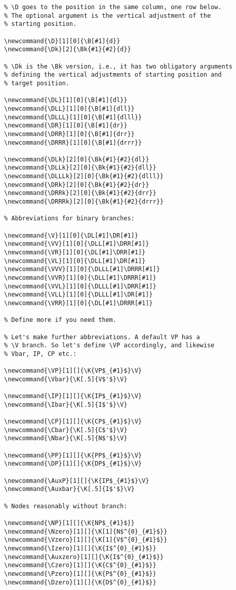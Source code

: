 \documentclass[12pt,a4paper]{article}
\begin{document}
\begin{verbatim}
% \D goes to the position in the same column, one row below. 
% The optional argument is the vertical adjustment of the 
% starting position. 

\newcommand{\D}[1][0]{\B[#1]{d}} 
\newcommand{\Dk}[2]{\Bk{#1}{#2}{d}}

% \Dk is the \Bk version, i.e., it has two obligatory arguments 
% defining the vertical adjustments of starting position and 
% target position.

\newcommand{\DL}[1][0]{\B[#1]{dl}} 
\newcommand{\DLL}[1][0]{\B[#1]{dll}} 
\newcommand{\DLLL}[1][0]{\B[#1]{dlll}} 
\newcommand{\DR}[1][0]{\B[#1]{dr}} 
\newcommand{\DRR}[1][0]{\B[#1]{drr}} 
\newcommand{\DRRR}[1][0]{\B[#1]{drrr}} 

\newcommand{\DLk}[2][0]{\Bk{#1}{#2}{dl}} 
\newcommand{\DLLk}[2][0]{\Bk{#1}{#2}{dll}} 
\newcommand{\DLLLk}[2][0]{\Bk{#1}{#2}{dlll}} 
\newcommand{\DRk}[2][0]{\Bk{#1}{#2}{dr}} 
\newcommand{\DRRk}[2][0]{\Bk{#1}{#2}{drr}} 
\newcommand{\DRRRk}[2][0]{\Bk{#1}{#2}{drrr}} 

% Abbreviations for binary branches:

\newcommand{\V}[1][0]{\DL[#1]\DR[#1]}
\newcommand{\VV}[1][0]{\DLL[#1]\DRR[#1]}
\newcommand{\VR}[1][0]{\DL[#1]\DRR[#1]}
\newcommand{\VL}[1][0]{\DLL[#1]\DR[#1]}
\newcommand{\VVV}[1][0]{\DLLL[#1]\DRRR[#1]}
\newcommand{\VVR}[1][0]{\DLL[#1]\DRRR[#1]}
\newcommand{\VVL}[1][0]{\DLLL[#1]\DRR[#1]}
\newcommand{\VLL}[1][0]{\DLLL[#1]\DR[#1]}
\newcommand{\VRR}[1][0]{\DL[#1]\DRRR[#1]}

% Define more if you need them.

% Let's make further abbreviations. A default VP has a 
% \V branch. So let's define \VP accordingly, and likewise 
% Vbar, IP, CP etc.:

\newcommand{\VP}[1][]{\K{VP$_{#1}$}\V}
\newcommand{\Vbar}{\K[.5]{V$'$}\V}

\newcommand{\IP}[1][]{\K{IP$_{#1}$}\V}
\newcommand{\Ibar}{\K[.5]{I$'$}\V}

\newcommand{\CP}[1][]{\K{CP$_{#1}$}\V}
\newcommand{\Cbar}{\K[.5]{C$'$}\V}
\newcommand{\Nbar}{\K[.5]{N$'$}\V}

\newcommand{\PP}[1][]{\K{PP$_{#1}$}\V}
\newcommand{\DP}[1][]{\K{DP$_{#1}$}\V}

\newcommand{\AuxP}[1][]{\K{IP$_{#1}$}\V}
\newcommand{\Auxbar}{\K[.5]{I$'$}\V}

% Nodes reasonably without branch:

\newcommand{\NP}[1][]{\K{NP$_{#1}$}}
\newcommand{\Nzero}[1][]{\K[1]{N$^{0}_{#1}$}}
\newcommand{\Vzero}[1][]{\K[1]{V$^{0}_{#1}$}}
\newcommand{\Izero}[1][]{\K{I$^{0}_{#1}$}}
\newcommand{\Auxzero}[1][]{\K{I$^{0}_{#1}$}}
\newcommand{\Czero}[1][]{\K{C$^{0}_{#1}$}}
\newcommand{\Pzero}[1][]{\K{P$^{0}_{#1}$}}
\newcommand{\Dzero}[1][]{\K{D$^{0}_{#1}$}}


\end{verbatim}
\end{document}
